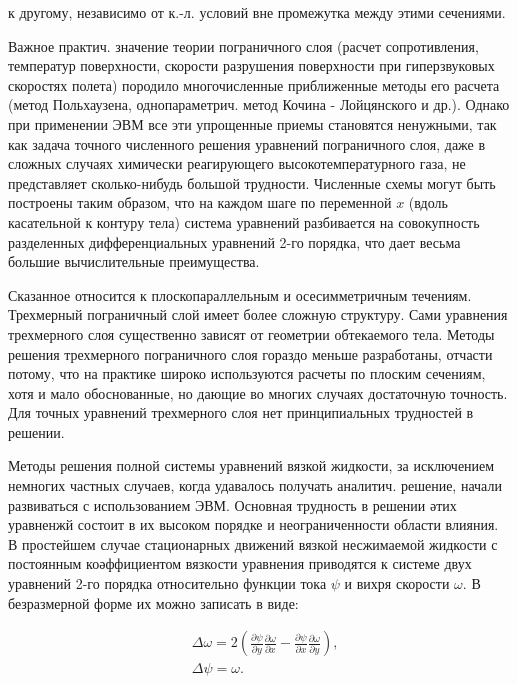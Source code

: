 \documentclass[10pt]{article}
\begin{document}
к другому, независимо от к.-л. условий вне промежутка между этими сечениями.



Важное практич. значение теории пограничного слоя (расчет сопротивления, температур поверхности, скорости разрушения поверхности при гиперзвуковых скоростях полета) породило многочисленные приближенные методы его расчета (метод Польхаузена, однопараметрич. метод Кочина - Лойцянского и др.). Однако при применении ЭВМ все эти упрощенные приемы становятся ненужными, так как задача точного численного решения уравнений пограничного слоя, даже в сложных случаях химически реагирующего высокотемпературного газа, не представляет сколько-нибудь большой трудности. Численные схемы могут быть построены таким образом, что на каждом шаге по переменной $x$ (вдоль касательной к контуру тела) система уравнений разбивается на совокупность разделенных дифференциальных уравнений 2-го порядка, что дает весьма большие вычислительные преимущества.



Сказанное относится к плоскопараллельным и осесимметричным течениям. Трехмерный пограничный слой имеет более сложную структуру. Сами уравнения трехмерного слоя существенно зависят от геометрии обтекаемого тела. Методы решения трехмерного пограничного слоя гораздо меньше разработаны, отчасти потому, что на практике широко используются расчеты по плоским сечениям, хотя и мало обоснованные, но дающие во многих случаях достаточную точность. Для точных уравнений трехмерного слоя нет принципиальных трудностей в решении.



Методы решения полной системы уравнений вязкой жидкости, за исключением немногих частных случаев, когда удавалось получать аналитич. решение, начали развиваться с использованием ЭВМ. Основная трудность в решении әтих уравненжй состоит в их высоком порядке и неограниченности области влияния. В простейшем случае стационарных движений вязкой несжимаемой жидкости с постоянным коәффициентом вязкости уравнения приводятся к системе двух уравнений 2-го порядка относительно функции тока $\psi$ и вихря скорости $\omega$. В безразмерной форме их можно записать в виде:



\[

\begin{aligned}

& \Delta \omega=2\left(\frac{\partial \psi}{\partial y} \frac{\partial \omega}{\partial x}-\frac{\partial \psi}{\partial x} \frac{\partial \omega}{\partial y}\right), \\

& \Delta \psi=\omega .

\end{aligned}

\]
\end{document}
